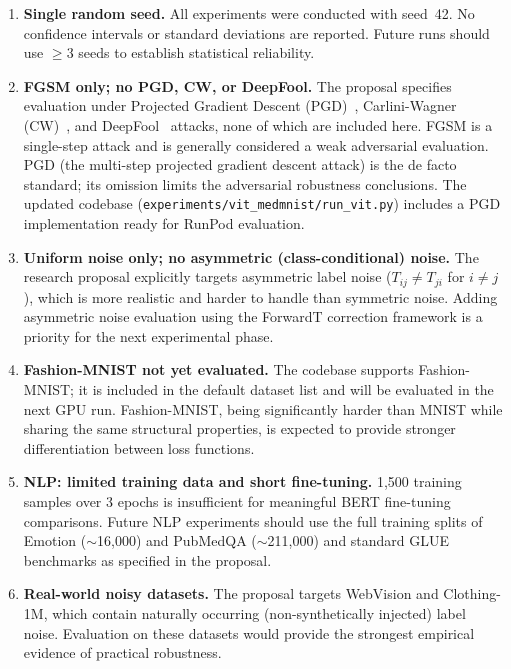 \begin{enumerate}[leftmargin=*,itemsep=4pt]
  \item \textbf{Single random seed.}
        All experiments were conducted with seed~42.
        No confidence intervals or standard deviations are reported.
        Future runs should use $\geq 3$ seeds to establish statistical reliability.

  \item \textbf{FGSM only; no PGD, CW, or DeepFool.}
        The proposal specifies evaluation under Projected Gradient
        Descent (PGD)~\citep{madry2018pgd}, Carlini-Wagner
        (CW)~\citep{carlini2017cw}, and DeepFool~\citep{moosavi2016deepfool}
        attacks, none of which are included here.
        FGSM is a single-step attack and is generally considered a weak
        adversarial evaluation.
        PGD (the multi-step projected gradient descent attack) is the
        de facto standard; its omission limits the adversarial robustness
        conclusions.
        The updated codebase (\texttt{experiments/vit\_medmnist/run\_vit.py})
        includes a PGD implementation ready for RunPod evaluation.

  \item \textbf{Uniform noise only; no asymmetric (class-conditional) noise.}
        The research proposal explicitly targets asymmetric label noise
        ($T_{ij} \neq T_{ji}$ for $i \neq j$), which is more realistic and
        harder to handle than symmetric noise.
        Adding asymmetric noise evaluation using the ForwardT correction
        framework is a priority for the next experimental phase.

  \item \textbf{Fashion-MNIST not yet evaluated.}
        The codebase supports Fashion-MNIST; it is included in the default
        dataset list and will be evaluated in the next GPU run.
        Fashion-MNIST, being significantly harder than MNIST while sharing
        the same structural properties, is expected to provide stronger
        differentiation between loss functions.

  \item \textbf{NLP: limited training data and short fine-tuning.}
        1{,}500 training samples over 3 epochs is insufficient for
        meaningful BERT fine-tuning comparisons.
        Future NLP experiments should use the full training splits of
        Emotion ($\sim$16{,}000) and PubMedQA ($\sim$211{,}000) and
        standard GLUE benchmarks as specified in the proposal.

  \item \textbf{Real-world noisy datasets.}
        The proposal targets WebVision and Clothing-1M, which contain
        naturally occurring (non-synthetically injected) label noise.
        Evaluation on these datasets would provide the strongest empirical
        evidence of practical robustness.
\end{enumerate}


